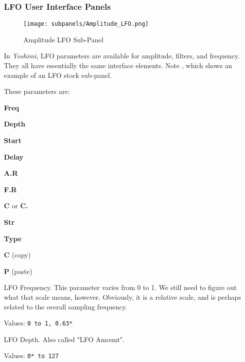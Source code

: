 \subsubsection{LFO User Interface Panels}
\label{subsubsec:lfo_user_interface_panels}

   \setcounter{ItemCounter}{0}      %

\begin{figure}[H]
   \centering 
   \texttt{[image: subpanels/Amplitude\_LFO.png]}
   \caption[Amplitude LFO Sub-Panel]{Amplitude LFO Sub-Panel}
   \label{fig:amplitude_lfo}
\end{figure}

   In \textsl{Yoshimi}, LFO parameters are available for amplitude, filters,
   and frequency.  They all have essentially the same interface elements.
   Note , which
   shows an example of an LFO stock sub-panel.

These parameters are:

   \begin{enumber}
      \item \textbf{Freq}
      \item \textbf{Depth}
      \item \textbf{Start}
      \item \textbf{Delay}
      \item \textbf{A.R}
      \item \textbf{F.R}
      \item \textbf{C} or \textbf{C.}
      \item \textbf{Str}
      \item \textbf{Type}
      \item \textbf{C} (copy)
      \item \textbf{P} (paste)
   \end{enumber}

   \setcounter{ItemCounter}{0}      %

   LFO Frequency.
   This parameter varies from 0 to 1.
   We still need to figure out what that scale means, however.
   Obviously, it is a relative scale, and is perhaps related to the
   overall sampling frequency.

   Values: \texttt{0 to 1, 0.63*}

   LFO Depth.  Also called "LFO Amount".

   Values: \texttt{0* to 127}

